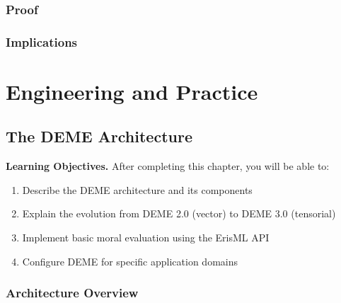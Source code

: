 \documentclass[12pt,letterpaper,twoside,openright]{book}
\theoremstyle{plain}
\theoremstyle{definition}
\theoremstyle{remark}
\begin{document}
\section{Proof}

\section{Implications}


\part{Engineering and Practice}
\label{part:engineering}

\chapter{The DEME Architecture}
\label{ch:deme}

\begin{framed}
\noindent\textbf{Learning Objectives.} After completing this chapter, you will be able to:
\begin{enumerate}
    \item Describe the DEME architecture and its components
    \item Explain the evolution from DEME 2.0 (vector) to DEME 3.0 (tensorial)
    \item Implement basic moral evaluation using the ErisML API
    \item Configure DEME for specific application domains
\end{enumerate}
\end{framed}

\section{Architecture Overview}
\end{document}
